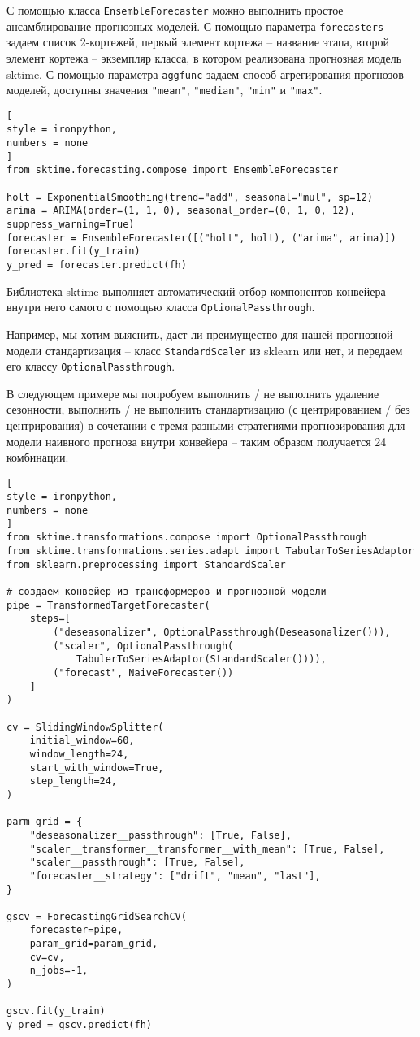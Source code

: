 \documentclass[%
	11pt,
	a4paper,
	utf8,
		]{article}
\begin{document}
С помощью класса \verb|EnsembleForecaster| можно выполнить простое ансамблирование прогнозных моделей. С помощью параметра \verb|forecasters| задаем список 2-кортежей, первый элемент кортежа -- название этапа, второй элемент кортежа -- экземпляр класса, в котором реализована прогнозная модель sktime. С помощью параметра \verb|aggfunc| задаем способ агрегирования прогнозов моделей, доступны значения \verb|"mean"|, \verb|"median"|, \verb|"min"| и \verb|"max"|.

\begin{lstlisting}[
style = ironpython,
numbers = none
]
from sktime.forecasting.compose import EnsembleForecaster

holt = ExponentialSmoothing(trend="add", seasonal="mul", sp=12)
arima = ARIMA(order=(1, 1, 0), seasonal_order=(0, 1, 0, 12), suppress_warning=True)
forecaster = EnsembleForecaster([("holt", holt), ("arima", arima)])
forecaster.fit(y_train)
y_pred = forecaster.predict(fh)
\end{lstlisting}

Библиотека sktime выполняет автоматический отбор компонентов конвейера внутри него самого с помощью класса \verb|OptionalPassthrough|. 

Например, мы хотим выяснить, даст ли преимущество для нашей прогнозной модели стандартизация -- класс \verb|StandardScaler| из sklearn или нет, и передаем его классу \verb|OptionalPassthrough|.

В следующем примере мы попробуем выполнить / не выполнить удаление сезонности, выполнить / не выполнить стандартизацию (с центрированием / без центрирования) в сочетании с тремя разными стратегиями прогнозирования для модели наивного прогноза внутри конвейера -- таким образом получается 24 комбинации.
\begin{lstlisting}[
style = ironpython,
numbers = none	
]
from sktime.transformations.compose import OptionalPassthrough
from sktime.transformations.series.adapt import TabularToSeriesAdaptor
from sklearn.preprocessing import StandardScaler

# создаем конвейер из трансформеров и прогнозной модели
pipe = TransformedTargetForecaster(
    steps=[
        ("deseasonalizer", OptionalPassthrough(Deseasonalizer())),
        ("scaler", OptionalPassthrough(
            TabulerToSeriesAdaptor(StandardScaler()))),
        ("forecast", NaiveForecaster())
    ]
)

cv = SlidingWindowSplitter(
    initial_window=60,
    window_length=24,
    start_with_window=True,
    step_length=24,
)

parm_grid = {
    "deseasonalizer__passthrough": [True, False],
    "scaler__transformer__transformer__with_mean": [True, False],
    "scaler__passthrough": [True, False],
    "forecaster__strategy": ["drift", "mean", "last"],
}

gscv = ForecastingGridSearchCV(
    forecaster=pipe,
    param_grid=param_grid,
    cv=cv,
    n_jobs=-1,
)

gscv.fit(y_train)
y_pred = gscv.predict(fh)
\end{lstlisting}
\end{document}
